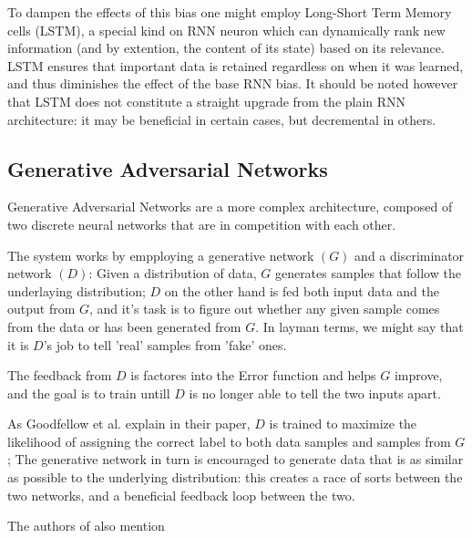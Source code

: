 To dampen the effects of this bias one might employ Long-Short Term Memory cells (LSTM), a special kind on RNN neuron which can dynamically rank new information (and by extention, the content of its state) based on its relevance. LSTM ensures that important data is retained regardless on when it was learned, and thus diminishes the effect of the base RNN bias.\newline
It should be noted however that LSTM does not constitute a straight upgrade from the plain RNN architecture: it may be beneficial in certain cases, but decremental in others.

\subsection{Generative Adversarial Networks}
Generative Adversarial Networks are a more complex architecture, composed of two discrete neural networks that are in competition with each other.

The system works by empploying a generative network $(G)$ and a discriminator network $(D)$:
Given a distribution of data, $G$ generates samples that follow the underlaying distribution; $D$ on the other hand is fed both input data and the output from $G$, and it's task is to figure out whether any given sample comes from the data or has been generated from $G$. In layman terms, we might say that it is $D$'s job to tell 'real' samples from 'fake' ones.

The feedback from $D$ is factores into the Error function and helps $G$ improve, and the goal is to train untill $D$ is no longer able to tell the two inputs apart.

As Goodfellow et al. \cite{Goodfellow2014} explain in their paper, $D$ is trained to maximize the likelihood of assigning the correct label to both data samples and samples from $G$; The generative network in turn is encouraged to generate data that is as similar as possible to the underlying distribution: this creates a race of sorts between the two networks, and a beneficial feedback loop between the two.

The authors of \cite{Goodfellow2014} also mention 
